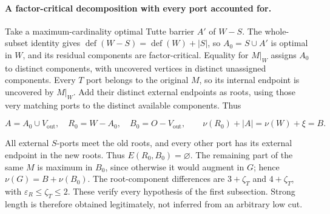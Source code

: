 \documentclass[11pt,a4paper]{article}
\theoremstyle{definition}
\begin{document}
\paragraph{A factor-critical decomposition with every port accounted for.}
Take a maximum-cardinality optimal Tutte barrier $A'$ of $W-S$. The whole-subset identity gives $\operatorname{def}(W-S)=\operatorname{def}(W)+|S|$, so $A_0=S\cup A'$ is optimal in $W$, and its residual components are factor-critical. Equality for $M|_W$ assigns $A_0$ to distinct components, with uncovered vertices in distinct unassigned components. Every $T$ port belongs to the original $M$, so its internal endpoint is uncovered by $M|_W$. Add their distinct external endpoints as roots, using those very matching ports to the distinct available components. Thus

\[
 A=A_0\cup V_{\mathrm{out}},\quad R_0=W-A_0,\quad B_0=O-V_{\mathrm{out}},
 \qquad\nu(R_0)+|A|=\nu(W)+\xi=B.
\]

All external $S$-ports meet the old roots, and every other port has its external endpoint in the new roots. Thus $E(R_0,B_0)=\varnothing$. The remaining part of the same $M$ is maximum in $B_0$, since otherwise it would augment in $G$; hence $\nu(G)=B+\nu(B_0)$. The root-component differences are $3+\zeta_T$ and $4+\zeta_T$, with $\varepsilon_R\le\zeta_T\le2$. These verify every hypothesis of the first subsection. Strong length is therefore obtained legitimately, not inferred from an arbitrary low cut.
\end{document}
